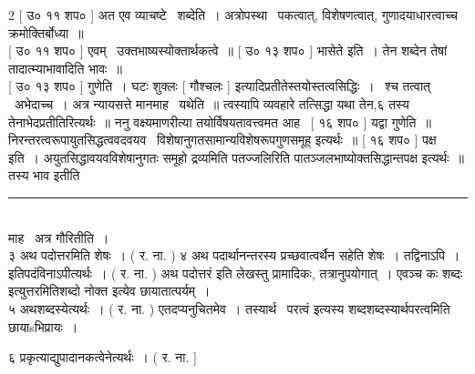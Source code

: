 \documentclass[11pt, openany]{book}
\begin{document}
\begin{multicols}{2}
 [ उ० ११ शप० ] अत एव व्याचष्टे \textendash\ शब्देति~। अत्रोपस्था \textendash\ पकत्वात्, विशेषणत्वात्, गुणादयाधारत्वाच्च क्रमोक्तिर्बोध्या~॥\\

 [ उ० ११ शप० ] एवम् \textendash\ उक्तभाष्यस्योक्तार्थकत्वे~॥ [ उ० १३ शप० ] भासेते इति~। तेन शब्देन तेषां तादात्म्याभावादिति भावः~॥\\

 [ उ० १३ शप० ] गुणेति~। घटः शुक्लः [ गौश्चलः ] इत्यादिप्रतीतेस्तयोस्तत्वसिद्धिः~। \textendash\ श्च तत्वात् \textendash\ अभेदाच्च~। अत्र न्यायसत्ते मानमाह \textendash\ यथेति~॥ त्वस्यापि व्यवहारे तत्सिद्धा यथा तेन,६ तस्य तेनाभेदप्रतीतिरित्यर्थः~॥ ननु वक्ष्यमाणरीत्या तयोर्विषयतावत्त्वमत आह \textendash\ [ १६ शप० ] यद्वा गुणेति~॥ निरन्तरत्वरूपायुतसिद्धत्ववदवयव \textendash\ विशेषानुगतसामान्यविशेषरूपगुणसमूह् इत्यर्थः~॥ [ १६ शप० ] पक्ष इति~। अयुतसिद्धावयवविशेषानुगतः समूहो द्रव्यमिति पतज्जलिरिति पातञ्जलभाष्योक्तसिद्धान्तपक्ष इत्यर्थः~॥ तस्य भाव इतीति

\noindent
\rule{1\linewidth}{0.5pt}\\

\noindent
माह \textendash\ अत्र गौरितीति~।\\

३ अथ पदोत्तरमिति शेषः~। ( र. ना. ) ४ अथ पदार्थानन्तरस्य प्रच्छवात्वर्थैन सहेति शेषः~। तद्विनाऽपि~। इतिपदंविनाऽपीत्यर्थः~। ( र. ना. ) {\qt अथ पदोत्तरं} इति लेखस्तु प्रामादिकः, तत्रानुपयोगात्~। एवञ्च {\qt कः शब्दः} इत्युत्तरमितिशब्दो नोक्त इत्येव छायातात्पर्यम्~।\\

५ अथशब्दस्येत्यर्थः~। ( र. ना. ) एतदप्यनुचितमेव~। तस्यार्थ \textendash\ परत्वं इत्यस्य शब्दशब्दस्यार्थपरत्वमिति छायाsभिप्रायः~।

६ प्रकृत्याद्युपादानकत्वेनेत्यर्थः~। ( र. ना. ] 
\end{multicols}

\newpage
\end{document}
